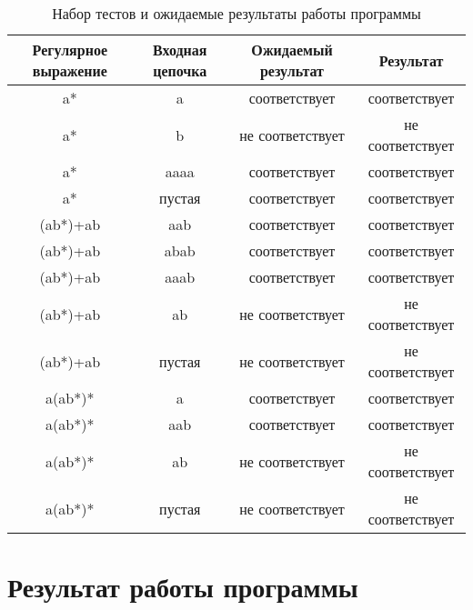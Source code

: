 \begin{table}[H]
    \centering
	\caption{Набор тестов и ожидаемые результаты работы программы}
    \label{tbl:tests}
	\begin{tabular}{|c|c|c|c|}
        \hline
        \begin{minipage}[t]{4cm}\centering \textbf{Регулярное выражение}\end{minipage} &
        \begin{minipage}[t]{4cm}\centering \textbf{Входная цепочка}\end{minipage} &
        \begin{minipage}[t]{4cm}\centering \textbf{Ожидаемый результат}\end{minipage} &
        \begin{minipage}[t]{4cm}\centering \textbf{Результат}\end{minipage} \\ \hline
        a* & a & соответствует & соответствует \\ \hline
        a* & b & не соответствует & не соответствует \\ \hline
        a* & aaaa & соответствует & соответствует \\ \hline
        a* & пустая & соответствует & соответствует \\ \hline

        (ab*)+ab & aab & соответствует & соответствует \\ \hline
        (ab*)+ab & abab & соответствует & соответствует \\ \hline
        (ab*)+ab & aaab & соответствует & соответствует \\ \hline
        (ab*)+ab & ab & не соответствует & не соответствует \\ \hline
        (ab*)+ab & пустая & не соответствует & не соответствует \\ \hline
        
        a(ab*)* & a & соответствует & соответствует \\ \hline
        a(ab*)* & aab & соответствует & соответствует \\ \hline
        a(ab*)* & ab & не соответствует & не соответствует \\ \hline
        a(ab*)* & пустая & не соответствует & не соответствует \\ \hline
    \end{tabular}
\end{table}


\section{Результат работы программы}

